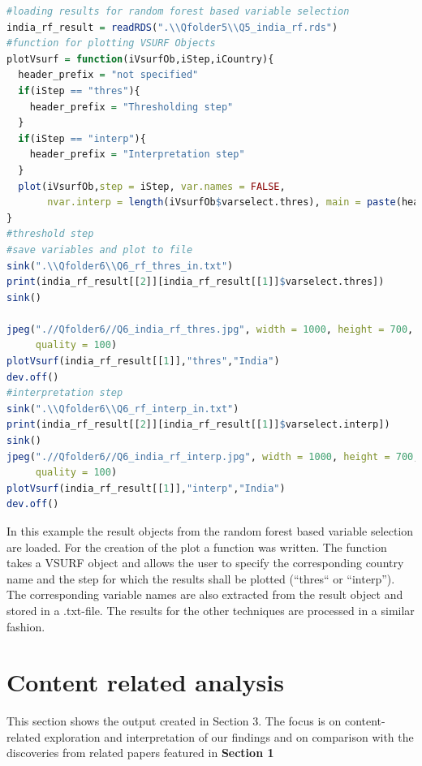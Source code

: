 \documentclass[11pt]{article}
\begin{document}
\begin{lstlisting}[language= R, captionpos=b,caption=\href{https://github.com/jaidikam/sps_ws1718/tree/master/Qfolder6}{SPL\_Q6\_result\_exploration}]
#loading results for random forest based variable selection 
india_rf_result = readRDS(".\\Qfolder5\\Q5_india_rf.rds")
#function for plotting VSURF Objects
plotVsurf = function(iVsurfOb,iStep,iCountry){
  header_prefix = "not specified"
  if(iStep == "thres"){
    header_prefix = "Thresholding step"
  }
  if(iStep == "interp"){
    header_prefix = "Interpretation step"
  }
  plot(iVsurfOb,step = iStep, var.names = FALSE,
       nvar.interp = length(iVsurfOb$varselect.thres), main = paste(header_prefix,iCountry))
}
#threshold step 
#save variables and plot to file
sink(".\\Qfolder6\\Q6_rf_thres_in.txt")
print(india_rf_result[[2]][india_rf_result[[1]]$varselect.thres])
sink() 

jpeg(".//Qfolder6//Q6_india_rf_thres.jpg", width = 1000, height = 700, units = "px", pointsize = 20,
     quality = 100)
plotVsurf(india_rf_result[[1]],"thres","India")
dev.off()
#interpretation step 
sink(".\\Qfolder6\\Q6_rf_interp_in.txt")
print(india_rf_result[[2]][india_rf_result[[1]]$varselect.interp])
sink()
jpeg(".//Qfolder6//Q6_india_rf_interp.jpg", width = 1000, height = 700, units = "px", pointsize = 20,
     quality = 100)
plotVsurf(india_rf_result[[1]],"interp","India")
dev.off()
\end{lstlisting}

In this example the result objects from the random forest based variable selection are loaded. For the creation of the plot a function was written. The function takes a VSURF object and allows the user to specify the corresponding country name and the step for which the results shall be plotted (“thres“ or “interp”). The corresponding variable names are also extracted from the result object and stored in a .txt-file. The results for the other techniques are processed in a similar fashion.

\section{Content related analysis}

This section shows the output created in Section 3. The focus is on content-related exploration and interpretation of our findings and on comparison with the discoveries from related papers featured in \textbf{Section 1}
\end{document}
